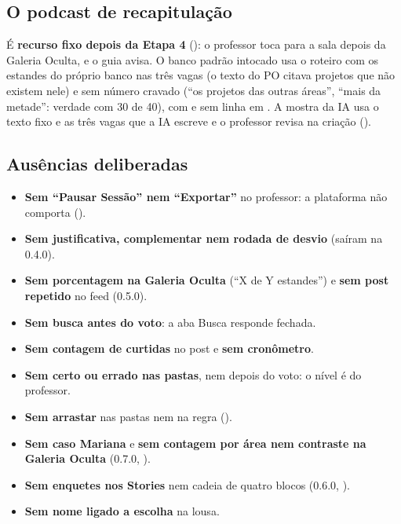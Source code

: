 \subsection{O podcast de recapitulação}

É \textbf{recurso fixo depois da Etapa 4} (): o professor toca
para a sala depois da Galeria Oculta, e o guia avisa. O banco padrão intocado
usa o roteiro  com os estandes do próprio banco nas três
vagas (o texto do PO citava projetos que não existem nele) e sem número cravado
(\enquote{os projetos das outras áreas}, \enquote{mais da metade}: verdade com
30 de 40), com  e
sem linha em . A mostra da IA usa o texto fixo e as três
vagas que a IA escreve e o professor revisa na criação ().

\subsection{Ausências deliberadas}

\begin{itemize}
  \item \textbf{Sem \enquote{Pausar Sessão} nem \enquote{Exportar}} no
    professor: a plataforma não comporta ().
  \item \textbf{Sem justificativa, complementar nem rodada de desvio} (saíram
    na 0.4.0).
  \item \textbf{Sem porcentagem na Galeria Oculta} (\enquote{X de Y
    estandes}) e \textbf{sem post repetido} no feed (0.5.0).
  \item \textbf{Sem busca antes do voto}: a aba Busca responde fechada.
  \item \textbf{Sem contagem de curtidas} no post e \textbf{sem cronômetro}.
  \item \textbf{Sem certo ou errado nas pastas}, nem depois do voto: o
    nível é do professor.
  \item \textbf{Sem arrastar} nas pastas nem na regra ().
  \item \textbf{Sem caso Mariana} e \textbf{sem contagem por área nem
    contraste na Galeria Oculta} (0.7.0, ).
  \item \textbf{Sem enquetes nos Stories} nem cadeia de quatro blocos (0.6.0,
    ).
  \item \textbf{Sem nome ligado a escolha} na lousa.
\end{itemize}

